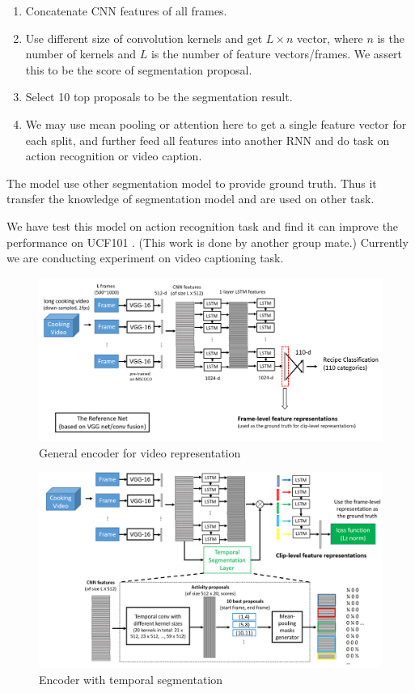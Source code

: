 \begin{enumerate}
\item Concatenate CNN features of all frames.
\item Use different size of convolution kernels and get $L\times n$ vector, where $n$ is the number of kernels and $L$ is the number of feature vectors/frames. We assert this to be the score of segmentation proposal.
\item Select 10 top proposals to be the segmentation result.
\item We may use mean pooling or attention here to get a single feature vector for each split, and further feed all features into another RNN and do task on action recognition or video caption.
\end{enumerate}

The model use other segmentation model to provide ground truth. Thus it transfer the knowledge of segmentation model and are used on other task.

We have test this model on action recognition task and find it can improve the performance on UCF101 \cite{Soomro2012UCF101}. (This work is done by another group mate.) Currently we are conducting experiment on video captioning task.

\begin{figure}
\centering
\includegraphics[width=15cm]{resources/ts1.png}
\caption{General encoder for video representation}
\label{fig:ts1}
\end{figure}

\begin{figure}
\centering
\includegraphics[width=15cm]{resources/ts2.png}
\caption{Encoder with temporal segmentation}
\label{fig:ts2}
\end{figure}


